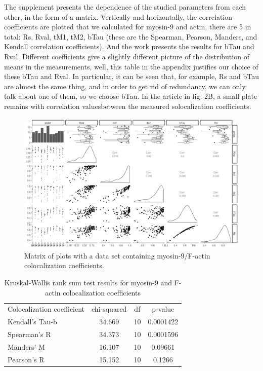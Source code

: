 \documentclass[english,authoryear]{elsarticle}
\begin{document}
The supplement presents the dependence of the studied parameters from each other, in the form of a matrix.
Vertically and horizontally, the correlation coefficients are plotted that we calculated for myosin-9 and actin, there are 5 in total: Rs, Rval, tM1, tM2, bTau (these are the Spearman, Pearson, Manders, and Kendall correlation coefficients).
And the work presents the results for bTau and Rval.
Different coefficients give a slightly different picture of the distribution of means in the measurements, well, this table in the appendix justifies our choice of these bTau and Rval.
In particular, it can be seen that, for example, Rs and bTau are almost the same thing, and in order to get rid of redundancy, we can only talk about one of them, so we choose bTau.
In the article in fig. 2B, a small plate remains with correlation values ​​between the measured solocalization coefficients.

\begin{figure}[h]
  \includegraphics[width=1\linewidth]{supp1.jpeg}
  \caption{Matrix of plots with a data set containing myosin-9/F-actin colocalization coefficients.}
  \label{supp1}
  \centering
\end{figure}

\begin{table} [h]
  \caption{Kruskal-Wallis rank sum test results for myosin-9 and F-actin colocalization coefficients}
  \label{tab1}
\centering
\begin{tabular}{l|ccc}
 Colocalization coefficient & chi-squared & df & p-value  \\
 Kendall's Tau-b & 34.669 & 10 & 0.0001422 \\
 Spearman's R & 34.373 & 10 &  0.0001596 \\
 Manders' M & 16.107 & 10 & 0.09661 \\
 Pearson's R & 15.152 & 10 & 0.1266

\end{tabular}
\end{table}
\end{document}
